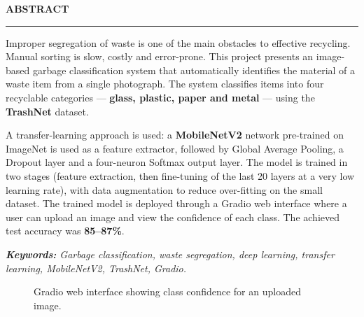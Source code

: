 \begin{center}{\Large\bfseries ABSTRACT}\end{center}\vspace{-4pt}\noindent\rule{\textwidth}{0.8pt}

Improper segregation of waste is one of the main obstacles to effective recycling. Manual sorting is slow, costly and error-prone. This project presents an image-based garbage classification system that automatically identifies the material of a waste item from a single photograph. The system classifies items into four recyclable categories --- \textbf{glass, plastic, paper and metal} --- using the \textbf{TrashNet} dataset.

A transfer-learning approach is used: a \textbf{MobileNetV2} network pre-trained on ImageNet is used as a feature extractor, followed by Global Average Pooling, a Dropout layer and a four-neuron Softmax output layer. The model is trained in two stages (feature extraction, then fine-tuning of the last 20 layers at a very low learning rate), with data augmentation to reduce over-fitting on the small dataset. The trained model is deployed through a Gradio web interface where a user can upload an image and view the confidence of each class. The achieved test accuracy was \textbf{85--87\%}.

\medskip
\textit{\textbf{Keywords:} Garbage classification, waste segregation, deep learning, transfer learning, MobileNetV2, TrashNet, Gradio.}

\bigskip
\begin{figure}[h]
  \centering
  \screenshot
  \caption{Gradio web interface showing class confidence for an uploaded image.}
\end{figure}
